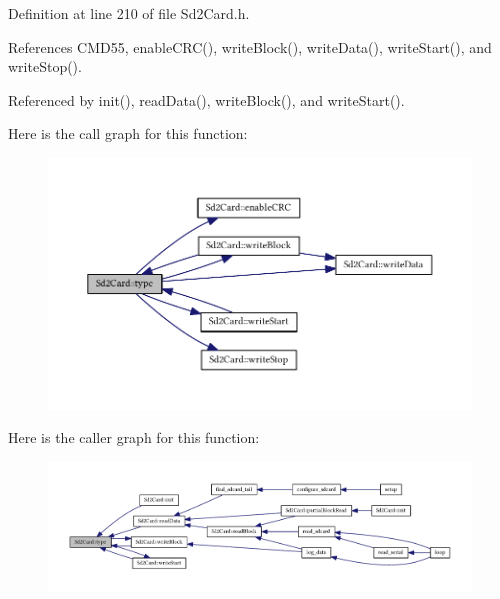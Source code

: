 Definition at line 210 of file Sd2\+Card.\+h.



References C\+M\+D55, enable\+C\+R\+C(), write\+Block(), write\+Data(), write\+Start(), and write\+Stop().



Referenced by init(), read\+Data(), write\+Block(), and write\+Start().



Here is the call graph for this function\+:
\nopagebreak
\begin{figure}[H]
\begin{center}
\leavevmode
\includegraphics[width=350pt]{class_sd2_card_a3ba97504f5928c932c346101d3dabfd2_cgraph}
\end{center}
\end{figure}




Here is the caller graph for this function\+:
\nopagebreak
\begin{figure}[H]
\begin{center}
\leavevmode
\includegraphics[width=350pt]{class_sd2_card_a3ba97504f5928c932c346101d3dabfd2_icgraph}
\end{center}
\end{figure}


